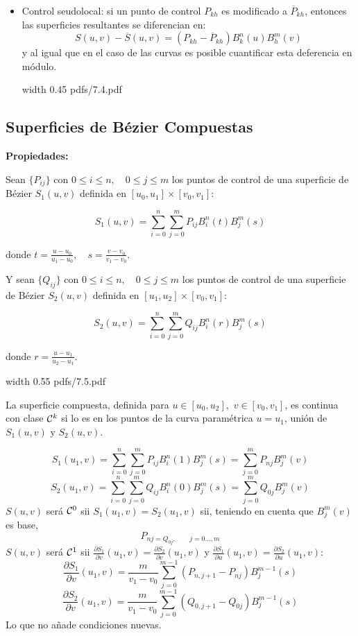 \documentclass[twoside]{report}
\newcommand{\colocapdf}[2]{\quad\pdfimage width #2 {pdfs/#1.pdf}}
\begin{document}
\begin{itemize}
\item Control seudolocal: si un punto de control $P_{kh}$ es modificado a $\overline{P}_{kh}$, entonces las superficies resultantes se diferencian en:
    $$S(u,v)-\overline{S}(u,v)=(P_{kh}-\overline{P}_{kh})B_k^n(u)B_h^m(v)$$
    y al igual que en el caso de las curvas es posible cuantificar esta deferencia en m\'{o}dulo.

\begin{center}
\colocapdf{7.4}{0.45\textwidth}
\end{center}
\end{itemize}

\subsection{Superficies de B\'{e}zier Compuestas}

{\bf Propiedades:}

Sean $\{P_{ij}\}$ con $0\leq i\leq n,\quad 0\leq j\leq m$ los puntos de control de una superficie de B\'{e}zier $S_1(u,v)$ definida en $[u_0,u_1] \times [v_0,v_1]$:

$$S_1(u,v)=\sum_{i=0}^n \sum_{j=0}^m P_{ij} B_i^n(t) B_j^m(s)$$

donde $t=\frac{u-u_0}{u_1-u_0},\quad s=\frac{v-v_0}{v_1-v_0}$.

\vspace{0.2cm}

Y sean $\{Q_{ij}\}$ con $0\leq i\leq n,\quad 0\leq j\leq m$ los puntos de control de una superficie de B\'{e}zier $S_2(u,v)$ definida en $[u_1,u_2] \times [v_0,v_1]$:

$$S_2(u,v)= \sum_{i=0}^n \sum_{j=0}^m Q_{ij} B_i^n(r) B_j^m(s)$$

donde $r=\frac{u-u_1}{u_2-u_1}.$

\begin{center}
\colocapdf{7.5}{0.55\textwidth}
\end{center}

La superficie compuesta, definida para $u\in [u_0,u_2],$ \quad $v\in [v_0,v_1]$, es continua con clase ${\cal C}^k$ si lo es en los puntos de la curva param\'{e}trica $u=u_1$, uni\'{o}n de $S_1(u,v)$ y $S_2(u,v)$.

$$S_1(u_1,v)= \sum_{i=0}^n \sum_{j=0}^m P_{ij} B_i^n(1) B_j^m(s)=\sum_{j=0}^m P_{nj} B_j^m(v)$$
$$S_2(u_1,v)= \sum_{i=0}^n \sum_{j=0}^m Q_{ij} B_i^n(0) B_j^m(s)= \sum_{j=0}^m Q_{0j} B_j^m (v)$$
$S(u,v)$ ser\'{a} ${\cal C}^0$ sii $S_1(u_1,v)=S_2(u_1,v)$ sii, teniendo en cuenta que $B_j^m(v)$ es base,
$$P_{nj=Q_{0j},\quad \quad j=0\ldots,m}$$
$S(u,v)$ ser\'{a} ${\cal C}^1$ sii $\frac{\partial S_1}{\partial v} (u_1,v)=\frac{\partial S_2}{\partial v}(u_1,v)$  y $\frac{\partial S_1}{\partial u} (u_1,v)=\frac{\partial S_2}{\partial u}(u_1,v)$:
$$\frac{\partial S_1}{\partial v}(u_1,v)= \frac{m}{v_1-v_0} \sum_{j=0}^{m-1} (P_{n,j+1}-P_{nj}) B_j^{m-1}(s)$$
$$\frac{\partial S_2}{\partial v}(u_1,v)= \frac{m}{v_1-v_0} \sum_{j=0}^{m-1} (Q_{0,j+1}-Q_{0j}) B_j^{m-1}(s)$$
Lo que no a\~{n}ade condiciones nuevas.
\end{document}
